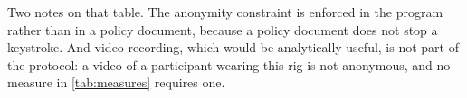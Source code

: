 Two notes on that table. The anonymity constraint is enforced in the program
rather than in a policy document, because a policy document does not stop a
keystroke. And video recording, which would be analytically useful, is not
part of the protocol: a video of a participant wearing this rig is not
anonymous, and no measure in \cref{tab:measures} requires one.
